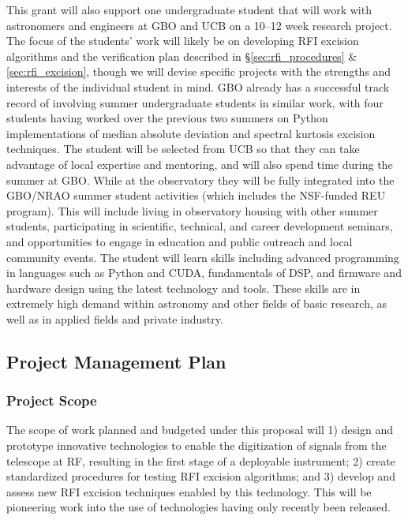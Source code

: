 \documentclass[10pt]{myNSF}
\begin{document}
This grant will also support one undergraduate student that will work
with astronomers and engineers at GBO and UCB on a 10--12 week
research project.  The focus of the students' work will likely be on
developing RFI excision algorithms and the verification plan described
in \S\ref{sec:rfi_procedures} \& \ref{sec:rfi_excision}, though we
will devise specific projects with the strengths and interests of the
individual student in mind.  GBO already has a successful track record
of involving summer undergraduate students in similar work, with four
students having worked over the previous two summers on Python
implementations of median absolute deviation and spectral kurtosis
excision techniques.  The student will be selected from UCB so that
they can take advantage of local expertise and mentoring, and will
also spend time during the summer at GBO.  While at the observatory
they will be fully integrated into the GBO/NRAO summer student
activities (which includes the NSF-funded REU program).  This will
include living in observatory housing with other summer students,
participating in scientific, technical, and career development
seminars, and opportunities to engage in education and public outreach
and local community events.  The student will learn skills including
advanced programming in languages such as Python and CUDA,
fundamentals of DSP, and firmware and hardware design using the latest
technology and tools.  These skills are in extremely high demand
within astronomy and other fields of basic research, as well as in
applied fields and private industry.  

\subsection{Project Management Plan}
\label{sec:management}

\subsubsection{Project Scope}
\label{sec:scope}

The scope of work planned and budgeted under this proposal will 1)
design and prototype innovative technologies to enable the
digitization of signals from the telescope at RF, resulting in the
first stage of a deployable instrument; 2) create standardized
procedures for testing RFI excision algorithms; and 3) develop and
assess new RFI excision techniques enabled by this technology.  This
will be pioneering work into the use of technologies having only
recently been released.
\end{document}
